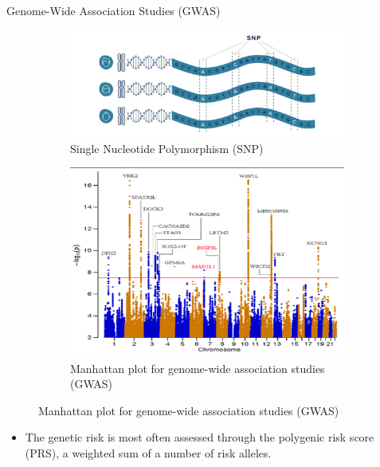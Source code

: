\documentclass{beamer}
\begin{document}
\begin{frame}{Genome-Wide Association Studies (GWAS)}

\begin{figure}
\centering
\begin{subfigure}{.5\textwidth}
  \centering
  \includegraphics[width=.9\linewidth]{images/SNP.jpeg}
  \caption{Single Nucleotide Polymorphism (SNP)}
  \label{fig:distribution}
\end{subfigure}%
\begin{subfigure}{.5\textwidth}
  \centering
  \includegraphics[width=.9\linewidth]{images/GWAS_SCZ.png}
    \caption{Manhattan plot for genome-wide association studies (GWAS)}
    \label{fig:GWAS Schizophrenia}
\end{subfigure}
\label{fig:GWAS}
\end{figure}

\begin{itemize}
    \item The genetic risk is most often assessed through the polygenic risk score (PRS), a weighted sum of a number of risk alleles. 
\end{itemize}


\end{frame}
\end{document}
